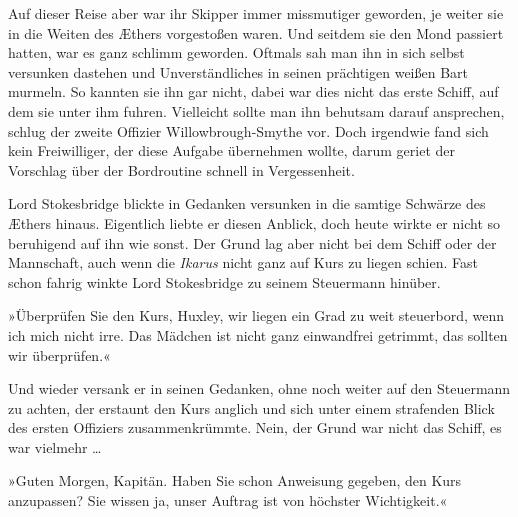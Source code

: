 Auf dieser Reise aber war ihr Skipper immer missmutiger geworden,
je weiter sie in die Weiten des Æthers vorgestoßen waren. Und
seitdem sie den Mond passiert hatten, war es ganz schlimm geworden.
Oftmals sah man ihn in sich selbst versunken dastehen und
Unverständliches in seinen prächtigen weißen Bart murmeln. So
kannten sie ihn gar nicht, dabei war dies nicht das erste Schiff,
auf dem sie unter ihm fuhren. Vielleicht sollte man ihn behutsam
darauf ansprechen, schlug der zweite Offizier Willowbrough-Smythe
vor. Doch irgendwie fand sich kein Freiwilliger, der diese Aufgabe
übernehmen wollte, darum geriet der Vorschlag über der Bordroutine
schnell in Vergessenheit.

\bigpar

Lord Stokesbridge blickte in Gedanken versunken in die samtige
Schwärze des Æthers hinaus. Eigentlich liebte er diesen Anblick,
doch heute wirkte er nicht so beruhigend auf ihn wie sonst. Der
Grund lag aber nicht bei dem Schiff oder der Mannschaft, auch wenn
die \emph{Ikarus} nicht ganz auf Kurs zu liegen schien. Fast schon
fahrig winkte Lord Stokesbridge zu seinem Steuermann hinüber.

»Überprüfen Sie den Kurs, Huxley, wir liegen ein Grad zu weit
steuerbord, wenn ich mich nicht irre. Das Mädchen ist nicht ganz
einwandfrei getrimmt, das sollten wir überprüfen.«

Und wieder versank er in seinen Gedanken, ohne noch weiter auf den
Steuermann zu achten, der erstaunt den Kurs anglich und sich unter
einem strafenden Blick des ersten Offiziers zusammenkrümmte. Nein,
der Grund war nicht das Schiff, es war vielmehr \ldots{}

»Guten Morgen, Kapitän. Haben Sie schon Anweisung gegeben, den Kurs
anzupassen? Sie wissen ja, unser Auftrag ist von höchster
Wichtigkeit.«

